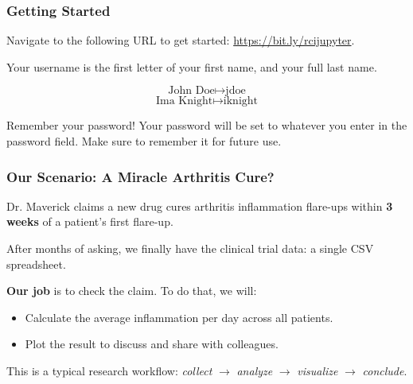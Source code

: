 \documentclass{beamer}
\begin{document}
\begin{frame}
    \frametitle{Getting Started}
    Navigate to the following URL to get started: \url{https://bit.ly/rcijupyter}.

    \bigskip

    Your username is the first letter of your first name, and your full last name.

    $$\text{John Doe} \mapsto \text{jdoe}$$
    $$\text{Ima Knight} \mapsto \text{iknight}$$

    \bigskip

    \begin{alertblock}{\centering Remember your password!}
        Your password will be set to whatever you enter in the password field.
        Make sure to remember it for future use.
    \end{alertblock}
\end{frame}

\begin{frame}
    \frametitle{Our Scenario: A Miracle Arthritis Cure?}
    Dr. Maverick claims a new drug cures arthritis inflammation
    flare-ups within \textbf{3 weeks} of a patient's first flare-up.

    \bigskip

    After months of asking, we finally have the clinical trial data:
    a single CSV spreadsheet.

    \bigskip

    \textbf{Our job} is to check the claim. To do that, we will:
    \begin{itemize}
        \item Calculate the average inflammation per day across all patients.
        \item Plot the result to discuss and share with colleagues.
    \end{itemize}

    \bigskip

    This is a typical research workflow: \emph{collect} $\rightarrow$
    \emph{analyze} $\rightarrow$ \emph{visualize} $\rightarrow$ \emph{conclude}.
\end{frame}
\end{document}
